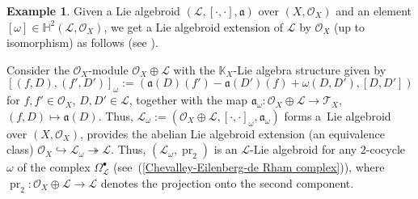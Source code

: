 \documentclass[pdftex]{sigma}
\numberwithin{equation}{section}
\theoremstyle{definition}
\newtheorem{Exm}[Thm]{Example}
\begin{document}
\begin{Exm} \label{extensions of L}
	Given a Lie algebroid $(\mathcal{L}, [\cdot, \cdot], \mathfrak{a})$ over $(X, \mathcal{O}_X)$ and an element $[\omega] \in \mathbb{H}^2(\mathcal{L}, \mathcal{O}_X)$, we get a Lie algebroid extension of $\mathcal{L}$ by $\mathcal{O}_X$ (up to isomorphism) as follows (see \cite{HOM, PT2}).
	
Consider the $\mathcal{O}_X$-module $\mathcal{O}_X \oplus \mathcal{L}$ with the $\mathbb{K}_X$-Lie algebra structure given by
\[
[(f,D), (f',D')]_{\omega}:=(\mathfrak{a}(D)(f')-\mathfrak{a}(D')(f)+\omega(D,D'), [D, D'])
\]
	for $f, f'\in \mathcal{O}_X$, $D, D' \in \mathcal{L}$, together with the map
$
\mathfrak{a}_{\omega}\colon \mathcal{O}_X \oplus \mathcal{L} \rightarrow \mathcal{T}_X$, $(f, D) \mapsto \mathfrak{a}(D)$.
	Thus, $\mathcal{L}_{\omega}:=(\mathcal{O}_X \oplus \mathcal{L}, [\cdot, \cdot]_{\omega}, \mathfrak{a}_{\omega})$ forms a~Lie algebroid over $(X, \mathcal{O}_X)$, provides the abelian Lie algebroid extension (an equivalence class)
	$\mathcal{O}_X \hookrightarrow \mathcal{L}_{\omega} \twoheadrightarrow \mathcal{L}$.
	Thus, $(\mathcal{L}_{\omega}, \operatorname{pr}_2)$ is an $\mathcal{L}$-Lie algebroid for any $2$-cocycle $\omega$ of the complex $\Omega^{\bullet}_{\mathcal{L}}$ (see~(\ref{Chevalley-Eilenberg-de Rham complex})),
	where $\operatorname{pr}_2\colon \mathcal{O}_X \oplus \mathcal{L} \rightarrow \mathcal{L}$ denotes the projection onto the second component.
\end{Exm}
\end{document}
